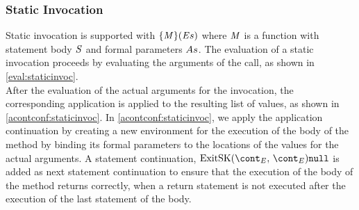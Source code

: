 \documentclass{article}
\begin{document}
\subsubsection{Static Invocation}
Static invocation is supported with $\{\mathit{M}\}(\mathit{E}{s})$ where $\mathit{M}$ is a function with statement body $\mathit{S}$ and formal parameters $As$.
The evaluation of a static invocation proceeds by evaluating the arguments of the call, as shown in \eqref{eval:staticinvoc}.\\
After the evaluation of the actual arguments for the invocation, the corresponding application is applied to the resulting list of values, as shown in \eqref{acontconf:staticinvoc}.
In \eqref{acontconf:staticinvoc}, we apply the application continuation by creating a new environment for the execution of the body of the method by binding its formal parameters to the locations of the values for the actual arguments.
A statement continuation, $\ExitSK{\econt}{\tt{null}}$ is added as next statement continuation to ensure that the execution of the body of the method returns correctly, when a return statement is not executed after the execution of the last statement of the body.
\end{document}
